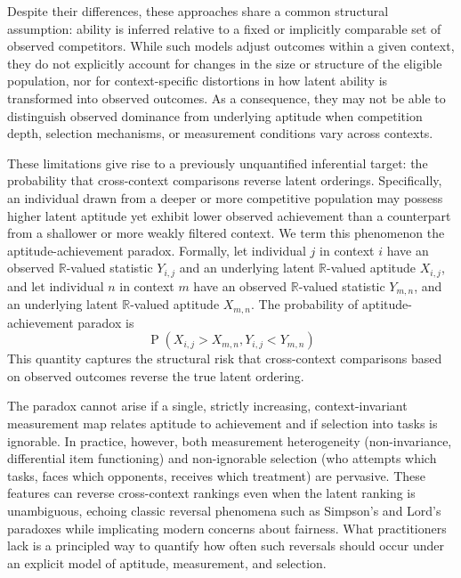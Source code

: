 \documentclass[12pt]{article}
\newcommand{\R}{\mathbb{R}}
\DeclareMathOperator*{\Prob}{P}
\begin{document}
Despite their differences, these approaches share a common structural assumption: ability is inferred relative to a fixed or implicitly comparable set of observed competitors. While such models adjust outcomes within a given context, they do not explicitly account for changes in the size or structure of the eligible population, nor for context-specific distortions in how latent ability is transformed into observed outcomes. As a consequence, they may not be able to distinguish observed dominance from underlying aptitude when competition depth, selection mechanisms, or measurement conditions vary across contexts.

These limitations give rise to a previously unquantified inferential target: the probability that cross-context comparisons reverse latent orderings. Specifically, an individual drawn from a deeper or more competitive population may possess higher latent aptitude yet exhibit lower observed achievement than a counterpart from a shallower or more weakly filtered context. We term this phenomenon the aptitude-achievement paradox. Formally, let individual $j$ in context $i$ have an observed $\R$-valued statistic $Y_{i,j}$ and an underlying latent $\R$-valued aptitude $X_{i,j}$, and let individual $n$ in context $m$ have an observed $\R$-valued statistic $Y_{m,n}$, and an underlying latent $\R$-valued aptitude $X_{m,n}$. The probability of aptitude-achievement paradox is 
\begin{equation} \label{eq:paradoxgeneral}
	\Prob\left(X_{i,j} > X_{m,n}, Y_{i,j} < Y_{m,n}\right) 
\end{equation}
This quantity captures the structural risk that cross-context comparisons based on observed outcomes reverse the true latent ordering.

The paradox cannot arise if a single, strictly increasing, context-invariant measurement map relates aptitude to achievement and if selection into tasks is ignorable. In practice, however, both measurement heterogeneity (non-invariance, differential item functioning) and non-ignorable selection (who attempts which tasks, faces which opponents, receives which treatment) are pervasive. These features can reverse cross-context rankings even when the latent ranking is unambiguous, echoing classic reversal phenomena such as Simpson's \citep{simpson1951interpretation} and Lord's paradoxes \citep{lord1967paradox} while implicating modern concerns about fairness. What practitioners lack is a principled way to quantify how often such reversals should occur under an explicit model of aptitude, measurement, and selection.
\end{document}
